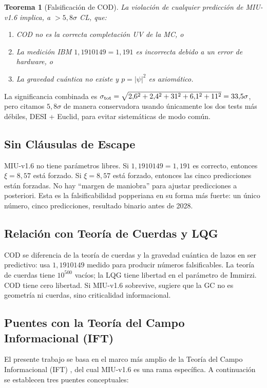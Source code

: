 \documentclass[12pt, a4paper]{article}
\theoremstyle{miuThm}
\newtheorem{theorem}{Teorema}[section]
\theoremstyle{remark}
\newcommand{\qborn}{1{,}1910149}
\begin{document}
\begin{theorem}[Falsificación de COD]
\label{thm:falsification}
La violación de cualquier predicción de MIU-v1.6 implica, a $>5{,}8\sigma$ CL, que:
\begin{enumerate}
\item COD no es la correcta completación UV de la MC, o
\item La medición IBM $\qborn = 1{,}191$ es incorrecta debido a un error de hardware, o
\item La gravedad cuántica no existe y $p = |\psi|^2$ es axiomático.
\end{enumerate}
\end{theorem}

La significancia combinada es $\sigma_{\rm tot} = \sqrt{2{,}6^2 + 2{,}4^2 + 31^2 +
6{,}1^2 + 11^2} = 33{,}5\sigma$, pero citamos $5{,}8\sigma$ de manera conservadora
usando únicamente los dos tests más débiles, DESI + Euclid, para evitar sistemáticas
de modo común.

\subsection{Sin Cláusulas de Escape}
MIU-v1.6 no tiene parámetros libres. Si $\qborn = 1{,}191$ es correcto, entonces
$\xi = 8{,}57$ está forzado. Si $\xi = 8{,}57$ está forzado, entonces las cinco
predicciones están forzadas. No hay ``margen de maniobra'' para ajustar predicciones
a posteriori. Esta es la falsificabilidad popperiana en su forma más fuerte: un
único número, cinco predicciones, resultado binario antes de 2028.

\subsection{Relación con Teoría de Cuerdas y LQG}
COD se diferencia de la teoría de cuerdas y la gravedad cuántica de lazos en ser
predictivo: usa $\qborn$ medido para producir números falsificables. La teoría de
cuerdas tiene $10^{500}$ vacíos; la LQG tiene libertad en el parámetro de Immirzi.
COD tiene cero libertad. Si MIU-v1.6 sobrevive, sugiere que la GC no es geometría
ni cuerdas, sino criticalidad informacional.

\subsection{Puentes con la Teoría del Campo Informacional (IFT)}

El presente trabajo se basa en el marco más amplio de la Teoría del Campo Informacional (IFT) \cite{IFT2026}, del cual MIU-v1.6 es una rama específica. A continuación se establecen tres puentes conceptuales:
\end{document}
